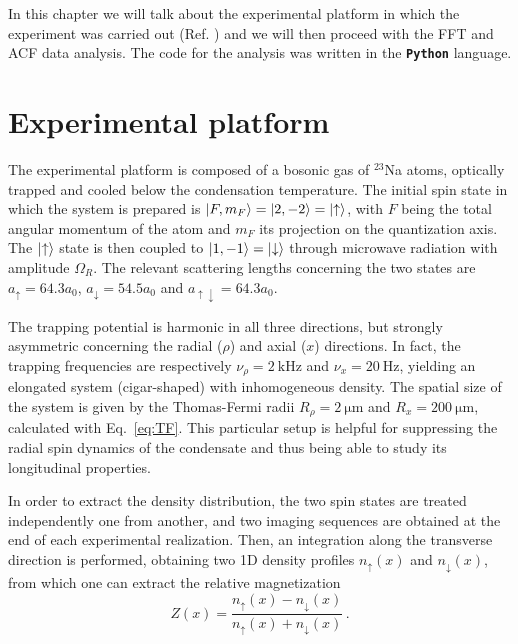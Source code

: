 In this chapter we will talk about the experimental platform in which the experiment was carried out (Ref. \cite{zenesini2024false}) and we will then proceed with the FFT and ACF data analysis. The code for the analysis was written in the \textbf{\texttt{Python}} language.

\section{Experimental platform}
The experimental platform is composed of a bosonic gas of $^{23}$Na atoms, optically trapped and cooled below the condensation temperature. The initial spin state in which the system is prepared is $\ket{F, m_F} = \ket{2, -2} = \ket{\uparrow}$, with $F$ being the total angular momentum of the atom 
and $m_F$ its projection on the quantization axis. The $\ket{\uparrow}$ state is then coupled to $\ket{1, -1} = \ket{\downarrow}$ through microwave radiation with amplitude $\Omega_R$. The relevant scattering lengths concerning the two states are $a_\uparrow = 64.3 a_0$, $a_\downarrow = 54.5 a_0$ and $a_{\uparrow\downarrow} = 64.3 a_0$.

The trapping potential is harmonic in all three directions, but strongly asymmetric concerning the radial ($\rho$) and axial ($x$) directions. In fact, the trapping frequencies are respectively $\nu_\rho = 2\ \unit{\kilo\hertz}$ and $\nu_x = 20\ \unit{\hertz}$, yielding an elongated system (cigar-shaped) with inhomogeneous density. The spatial size of the system is given by the Thomas-Fermi radii $R_\rho = 2\ \unit{\micro\meter}$ and $R_x = 200\ \unit{\micro\meter}$, calculated with Eq.\ \eqref{eq:TF}. This particular setup is helpful for suppressing the radial spin dynamics of the condensate and thus being able to study its longitudinal properties.

In order to extract the density distribution, the two spin states are treated independently one from another, and two imaging sequences are obtained at the end of each experimental realization. Then, an integration along the transverse direction is performed, obtaining two 1D density profiles $n_\uparrow(x)$ and $n_\downarrow(x)$, from which one can extract the relative magnetization
\begin{equation}
    Z(x) = \frac{n_\uparrow(x) - n_\downarrow(x)}{n_\uparrow(x) + n_\downarrow(x)}\, .
    \label{eq:magnetization}
\end{equation}

